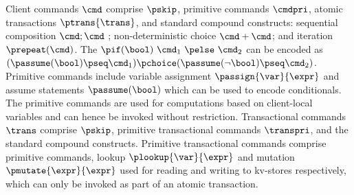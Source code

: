 Client commands \(\cmd\) comprise \(\pskip\), primitive commands
\(\cmdpri\), atomic transactions \(\ptrans{\trans}\), and standard
compound constructs: sequential composition \( \cmd ; \cmd \) ;
non-deterministic choice \( \cmd + \cmd \); and iteration \( \prepeat(\cmd) \). 
The \( \pif(\bool) \ \cmd_1 \ \pelse \ \cmd_2 \) can be encoded as 
\( (\passume(\bool) \pseq \cmd_1) \pchoice (\passume(\neg\bool) \pseq \cmd_2)  \).
Primitive commands include variable assignment
\(\passign{\var}{\expr}\) and assume statements \(\passume(\bool)\)
which can be used to encode conditionals.
The primitive commands are used for computations based on client-local variables 
and can hence be invoked without restriction. 
Transactional commands \(\trans\) comprise
\(\pskip\), primitive transactional commands \(\transpri\), 
and the standard compound constructs. 
Primitive transactional commands comprise primitive commands, 
lookup \(\plookup{\var}{\expr}\) and mutation \(\pmutate{\expr}{\expr}\) 
used for reading and writing to kv-stores respectively, 
which can only be invoked as part of an atomic transaction.

